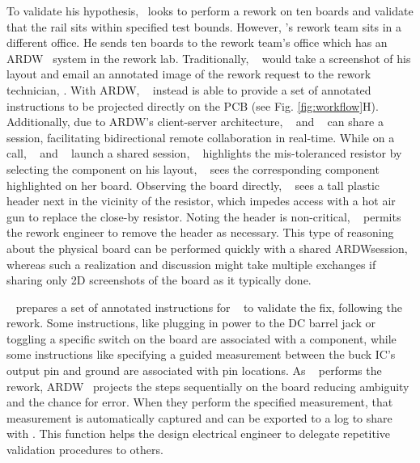 \documentclass [11pt, proquest] {uwthesis}[2020/02/24]
\newcommand{\ARDWname}{ARDW}
\begin{document}
To validate his hypothesis, ~\personname looks to perform a rework on ten boards and validate that the rail sits within specified test bounds. However, \personname’s rework team sits in a different office. He sends ten boards to the rework team’s office which has an \ARDWname~ system in the rework lab. Traditionally, \personname~ would take a screenshot of his layout and email an annotated image of the rework request to the rework technician, \persontwoname. With \ARDWname, \personname~ instead is able to provide a set of annotated instructions to be projected directly on the PCB  (see Fig. \ref{fig:workflow}H). Additionally, due to \ARDWname’s client-server architecture, \personname~ and \persontwoname~ can share a session, facilitating bidirectional remote collaboration in real-time. While on a call, \personname~ and \persontwoname~ launch a shared session, \personname~ highlights the mis-toleranced resistor by selecting the component on his layout, \persontwoname~ sees the corresponding component highlighted on her board. Observing the board directly, \persontwoname~ sees a tall plastic header next in the vicinity of the resistor, which impedes access with a hot air gun to replace the close-by resistor. Noting the header is non-critical, \personname~ permits the rework engineer to remove the header as necessary. This type of reasoning about the physical board can be performed quickly with a shared \ARDWname session, whereas such a realization and discussion might take multiple exchanges if sharing only 2D screenshots of the board as it typically done.

\personname~ prepares a set of annotated instructions for \persontwoname~ to validate the fix, following the rework. Some instructions, like plugging in power to the DC barrel jack or toggling a specific switch on the board are associated with a component, while some instructions like specifying a guided measurement between the buck IC’s output pin and ground are associated with pin locations. As \persontwoname~ performs the rework, \ARDWname~ projects the steps sequentially on the board reducing ambiguity and the chance for error. When they perform the specified measurement, that measurement is automatically captured and can be exported to a log to share with \personname. This function helps the design electrical engineer to delegate repetitive validation procedures to others.


\end{document}
